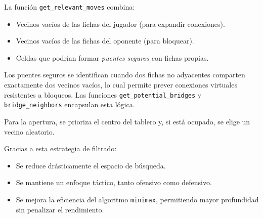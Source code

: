 \documentclass[12pt]{article}
\begin{document}
La función \texttt{get\_relevant\_moves} combina:
\begin{itemize}
  \item Vecinos vacíos de las fichas del jugador (para expandir conexiones).
  \item Vecinos vacíos de las fichas del oponente (para bloquear).
  \item Celdas que podrían formar \textit{puentes seguros} con fichas propias.
\end{itemize}

Los puentes seguros se identifican cuando dos fichas no adyacentes comparten exactamente dos vecinos vacíos, lo cual permite prever conexiones virtuales resistentes a bloqueos. Las funciones \texttt{get\_potential\_bridges} y \texttt{bridge\_neighbors} encapsulan esta lógica.

Para la apertura, se prioriza el centro del tablero y, si está ocupado, se elige un vecino aleatorio.

Gracias a esta estrategia de filtrado:
\begin{itemize}
  \item Se reduce drásticamente el espacio de búsqueda.
  \item Se mantiene un enfoque táctico, tanto ofensivo como defensivo.
  \item Se mejora la eficiencia del algoritmo \texttt{minimax}, permitiendo mayor profundidad sin penalizar el rendimiento.
\end{itemize}
\end{document}
